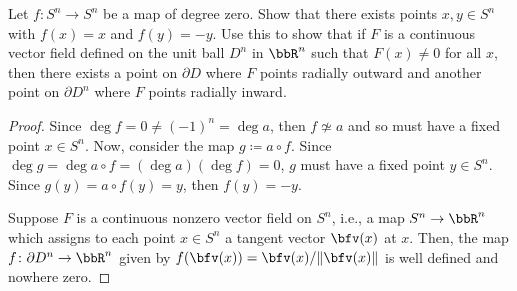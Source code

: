 \begin{problem}[Hatcher {\S}2.2, Ex.\@ 3]
Let $f\colon S^n\to S^n$ be a map of degree zero. Show that there exists
points $x,y\in S^n$ with $f(x)=x$ and $f(y)=-y$. Use this to show that if
$F$ is a continuous vector field defined on the unit ball $D^n$ in $\bbR^n$
such that $F(x)\neq 0$ for all $x$, then there exists a point on $\partial
D$ where $F$ points radially outward and another point on $\partial D^n$
where  $F$ points radially inward.
\end{problem}
\begin{proof}
Since $\deg f=0\neq (-1)^n=\deg a$, then $f\nsimeq a$ and so must have a
fixed point $x\in S^n$. Now, consider the map $g\coloneqq a\circ f$. Since
$\deg g=\deg a\circ f=(\deg a)(\deg f)=0$, $g$ must have a fixed point
$y\in S^n$. Since $g(y)=a\circ f(y)=y$, then $f(y)=-y$.

Suppose $F$ is a continuous nonzero vector field on $S^n$, i.e., a map
$S^n\to\bbR^n$ which assigns to each point $x\in S^n$ a tangent vector
$\bfv(x)$ at $x$. Then, the map $f\colon\partial D^n\to\bbR^n$ given by
$f(\bfv(x))=\bfv(x)/\|\bfv(x)\|$ is well defined and nowhere zero.
\end{proof}
\newpage

